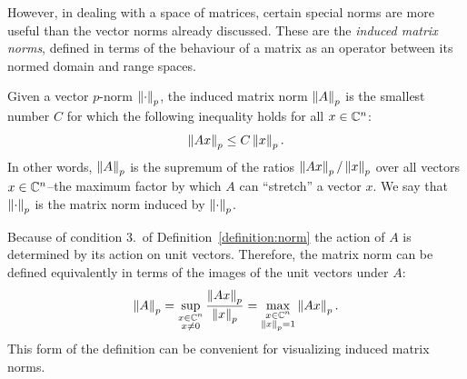 However, in dealing with a space of matrices, certain special norms are more useful than the vector norms already discussed. These are the {\em induced matrix norms}, defined in terms of the behaviour of a matrix as an operator between its normed domain and range spaces.

Given a vector $p$-norm $\left\|{\cdot}\right\|_p$, the induced matrix norm $\left\|{A}\right\|_p$ is the smallest number $C$ for which the following inequality holds for all $x\in\mathbb{C}^n$:
\begin{equation}
\left\|{Ax}\right\|_p \le C\left\|{x}\right\|_p.
\end{equation}
In other words, $\left\|{A}\right\|_p$ is the supremum of the ratios $\left\|{Ax}\right\|_p/\left\|{x}\right\|_p$ over all vectors $x\in\mathbb{C}^n$--the maximum factor by which $A$ can ``stretch'' a vector $x$. We say that $\left\|{\cdot}\right\|_p$ is the matrix norm induced by $\left\|{\cdot}\right\|_p$.

Because of condition 3.~of Definition~\ref{definition:norm} the action of $A$ is determined by its action on unit vectors. Therefore, the matrix norm can be defined equivalently in terms of the images of the unit vectors under $A$:
\begin{equation}
\left\|{A}\right\|_p = \sup_{\substack{x\in\mathbb{C}^n\\x\ne0}}\dfrac{\left\|{Ax}\right\|_p}{\left\|{x}\right\|_p} = \max_{\substack{x\in\mathbb{C}^n\\ \left\|{x}\right\|_p = 1}}\left\|{Ax}\right\|_p.
\end{equation}
This form of the definition can be convenient for visualizing induced matrix norms.

